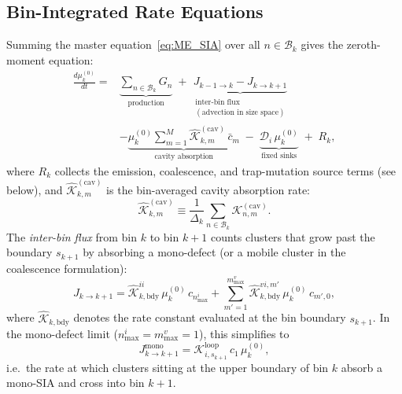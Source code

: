 \subsection{Bin-Integrated Rate Equations}
\label{sec:bin_rate_eq}

Summing the master equation~\eqref{eq:ME_SIA} over all $n \in
\mathcal{B}_k$ gives the zeroth-moment equation:
\begin{equation}\label{eq:mu0_eq}
\begin{split}
    \frac{d\mu_k^{(0)}}{dt} = {} &
    \underbrace{
        \sum_{n \in \mathcal{B}_k} G_n
    }_{\text{production}}
    \;+\; \underbrace{
        J_{k-1 \to k} - J_{k \to k+1}
    }_{\substack{\text{inter-bin flux}\\(\text{advection in size space})}}
    \\[4pt]
    &- \underbrace{
        \mu_k^{(0)}\sum_{m=1}^{M}
        \hat{\mathcal{K}}_{k,m}^{(\mathrm{cav})}\,\bar{c}_m
    }_{\text{cavity absorption}}
    \;-\; \underbrace{
        \mathcal{D}_i\,\mu_k^{(0)}
    }_{\text{fixed sinks}}
    \;+\; R_k,
\end{split}
\end{equation}
where $R_k$ collects the emission, coalescence, and trap-mutation
source terms (see below), and $\hat{\mathcal{K}}_{k,m}^{(\mathrm{cav})}$
is the bin-averaged cavity absorption rate:
\begin{equation}\label{eq:Khat}
    \hat{\mathcal{K}}_{k,m}^{(\mathrm{cav})}
    \equiv \frac{1}{\Delta_k}
    \sum_{n \in \mathcal{B}_k}
    \mathcal{K}_{n,m}^{(\mathrm{cav})}.
\end{equation}
The \emph{inter-bin flux} from bin $k$ to bin $k+1$ counts clusters
that grow past the boundary $s_{k+1}$ by absorbing a mono-defect
(or a mobile cluster in the coalescence formulation):
\begin{equation}\label{eq:inter_bin_flux}
    J_{k \to k+1}
    = \hat{\mathcal{K}}_{k,\mathrm{bdy}}^{ii}\,
      \mu_k^{(0)}\,c_{n_{\max}^i}
    + \sum_{m'=1}^{m_{\max}^v}
      \hat{\mathcal{K}}_{k,\mathrm{bdy}}^{vi,m'}\,
      \mu_k^{(0)}\,c_{m',0},
\end{equation}
where $\hat{\mathcal{K}}_{k,\mathrm{bdy}}$ denotes the rate constant
evaluated at the bin boundary $s_{k+1}$. In the mono-defect limit
($n_{\max}^i = m_{\max}^v = 1$), this simplifies to
\begin{equation}\label{eq:Jkk1_monodefect}
    J_{k \to k+1}^{\mathrm{mono}}
    = \mathcal{K}_{i,s_{k+1}}^{\mathrm{loop}}\,c_1\,\mu_k^{(0)},
\end{equation}
i.e.\ the rate at which clusters sitting at the upper boundary of bin
$k$ absorb a mono-SIA and cross into bin $k+1$.

